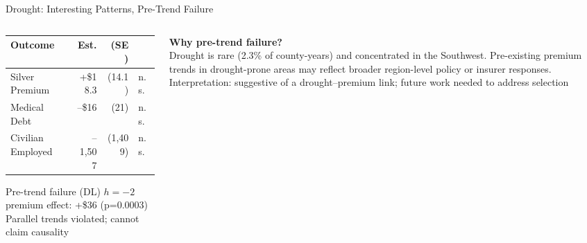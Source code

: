 \documentclass[aspectratio=169,11pt]{beamer}
\newcommand{\tealtext}[1]{{\color{Teal}#1}}
\newcommand{\graytext}[1]{{\color{WarmGray}#1}}
\begin{document}
\begin{frame}{Drought: Interesting Patterns, Pre-Trend Failure}
  \begin{columns}[T]
    \begin{column}{0.56\textwidth}
      \small
      \begin{tabular}{lrrl}
        \toprule
        Outcome & Est. & (SE) & \\
        \midrule
        Silver Premium & +\$18.3 & (14.1) & \graytext{n.s.} \\
        Medical Debt & --\$16 & (21) & \graytext{n.s.} \\
        Civilian Employed & --1,507 & (1,409) & \graytext{n.s.} \\
        \bottomrule
      \end{tabular}
      \vspace{0.5em}
      \begin{alertblock}{Pre-trend failure (DL)}
        $h=-2$ premium effect: +\$36 (p=0.0003)\\
        \graytext{\footnotesize Parallel trends violated; cannot claim causality}
      \end{alertblock}
    \end{column}
    \begin{column}{0.40\textwidth}
      \textbf{Why pre-trend failure?}\\[0.3em]
      Drought is rare (2.3\% of county-years) and concentrated in the Southwest. Pre-existing premium trends in drought-prone areas may reflect broader region-level policy or insurer responses.\\[0.5em]
      \tealtext{Interpretation: suggestive of a drought--premium link; future work needed to address selection}
    \end{column}
  \end{columns}
\end{frame}
\end{document}
